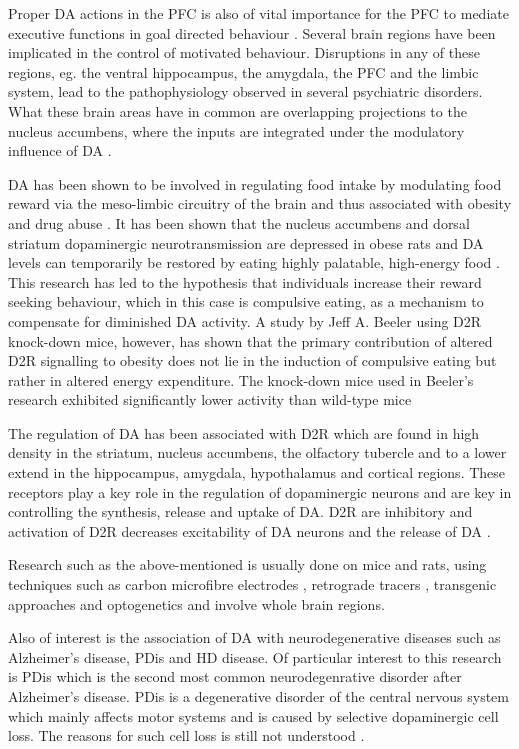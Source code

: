 Proper \ac{DA} actions in the \ac{PFC} is also of vital importance for the \ac{PFC} to mediate executive functions in goal directed behaviour \cite{Goto2007}. Several brain regions have been implicated in the control of motivated behaviour. Disruptions in any of these regions, eg. the ventral hippocampus, the amygdala, the \ac{PFC} and the limbic system, lead to the pathophysiology observed in several psychiatric disorders. What these brain areas have in common are overlapping projections to the nucleus accumbens, where the inputs are integrated under the modulatory influence of \ac{DA} \cite{Grace2007}.

\ac{DA} has been shown to be involved in regulating food intake by modulating food reward via the meso-limbic circuitry of the brain and thus associated with obesity and drug abuse \cite{Wang2001}.  It has been shown that the nucleus accumbens and dorsal striatum dopaminergic neurotransmission are depressed in obese rats and \ac{DA} levels can temporarily be restored by eating highly palatable, high-energy food \cite{Geiger2009}. This research has led to the hypothesis that individuals increase their reward seeking behaviour, which in this case is compulsive eating, as a mechanism to compensate for diminished \ac{DA} activity. A study by Jeff A. Beeler using \ac{D2R} knock-down mice, however, has shown that the primary contribution of altered \ac{D2R} signalling to obesity does not lie in the induction of compulsive eating but rather in altered energy expenditure. The knock-down mice used in Beeler's research exhibited significantly lower activity than wild-type mice \cite{Beeler2015}

The regulation of \ac{DA} has been associated with \ac{D2R} which are found in high density in the striatum, nucleus accumbens, the olfactory tubercle and to a lower extend in the hippocampus, amygdala, hypothalamus and cortical regions. These receptors play a key role in the regulation of dopaminergic neurons and are key in controlling the synthesis, release and uptake of \ac{DA}. \ac{D2R} are inhibitory and activation of \ac{D2R} decreases excitability of \ac{DA} neurons and the release of \ac{DA} \cite{Ford2014}.

Research such as the above-mentioned is usually done on mice and rats, using techniques such as carbon microfibre electrodes \cite{Suaud-Chagny1991}, retrograde tracers \cite{Root2014}, transgenic approaches and optogenetics \cite{Pignatelli2015} and involve whole brain regions. 

Also of interest is the association of \ac{DA} with neurodegenerative diseases such as Alzheimer's disease, \ac{PDis} and \ac{HD} disease. Of particular interest to this research is \ac{PDis} which is the second most common neurodegenrative disorder after Alzheimer's disease. \ac{PDis} is a degenerative disorder of the central nervous system which mainly affects motor systems and is caused by selective dopaminergic cell loss. The reasons for such cell loss is still not understood \cite{Lau2006}. 

